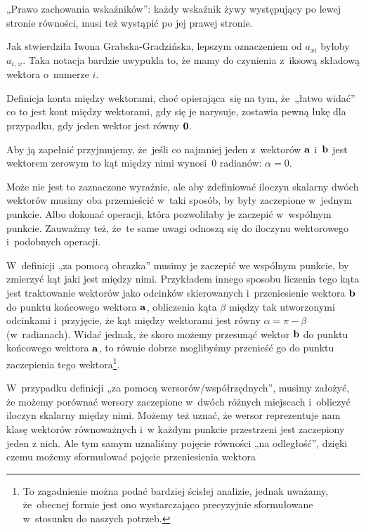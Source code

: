 \documentclass[a4paper,11pt]{article}
\numberwithin{equation}{section}
\begin{document}
„Prawo zachowania wskaźników”: każdy wskaźnik żywy występujący po lewej
stronie równości, musi też wystąpić po jej prawej stronie.

\VerSpaceFour





\noindent
{} Jak stwierdziła Iwona Grabska-Gradzińska, lepszym
oznaczeniem od $a_{ xi }$ byłoby $a_{ i,\, x }$. Taka notacja bardzie uwypukla
to, że mamy do czynienia z~iksową składową wektora o~numerze $i$.

\VerSpaceFour





\noindent
{} Definicja konta między wektorami, choć opierająca~się na tym,
że~„łatwo widać” co to jest kont między wektorami, gdy się je narysuje,
zostawia pewną lukę dla przypadku, gdy jeden wektor jest równy
$\mathbf{0}$.

Aby ją zapełnić przyjmujemy, że~jeśli co najmniej jeden z~wektorów
$\mathbf{a}$ i~$\mathbf{b}$ jest wektorem zerowym to kąt między nimi
wynosi~$0$ radianów: $\alpha = 0$.

\VerSpaceFour





\noindent
{} Może nie jest to zaznaczone wyraźnie, ale aby zdefiniować iloczyn
skalarny dwóch wektorów musimy oba przemieścić w~taki sposób, by były
zaczepione w~jednym punkcie. Albo dokonać operacji, która pozwoliłaby je
zaczepić w~wspólnym punkcie. Zauważmy też, że~te same uwagi odnoszą się do
iloczynu wektorowego i~podobnych operacji.

W~definicji „za pomocą obrazka” musimy je zaczepić we wspólnym punkcie, by
zmierzyć kąt jaki jest między nimi. Przykładem innego sposobu liczenia tego
kąta jest traktowanie wektorów jako odcinków skierowanych i~przeniesienie
wektora $\mathbf{b}$ do punktu końcowego wektora $\mathbf{a}$, obliczenia kąta
$\beta$ między tak utworzonymi odcinkami i~przyjęcie, że kąt między wektorami
jest równy $\alpha = \pi - \beta$ (w~radianach). Widać jednak, że skoro możemy
przesunąć wektor $\mathbf{b}$ do punktu końcowego wektora $\mathbf{a}$, to
równie dobrze moglibyśmy przenieść go do punktu zaczepienia tego
wektora\footnote{To zagadnienie można podać bardziej ścisłej analizie,
  jednak uważamy, że~obecnej formie jest ono wystarczająco precyzyjnie
  sformułowane w~stosunku do naszych potrzeb.}.

W~przypadku definicji „za pomocą wersorów/współrzędnych”, musimy założyć, że
możemy porównać wersory zaczepione w~dwóch różnych miejscach i~obliczyć
iloczyn skalarny między nimi. Możemy też uznać, że wersor reprezentuje nam
klasę wektorów równoważnych i~w każdym punkcie przestrzeni jest zaczepiony
jeden z nich. Ale tym samym uznaliśmy pojęcie równości „na odległość”,
dzięki czemu możemy sformułować pojęcie przeniesienia wektora
\end{document}
